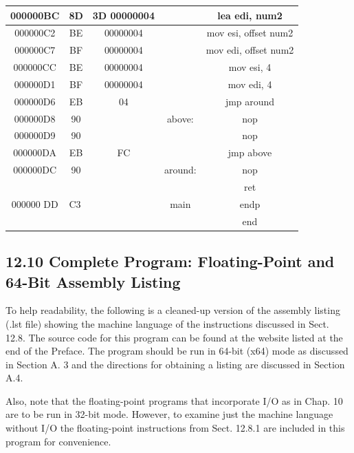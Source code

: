 \documentclass[10pt]{article}
\begin{document}
\begin{center}
\begin{tabular}{|c|c|c|c|c|}
\hline
000000BC & 8D & 3D 00000004 &  & lea edi, num2 \\
\hline
000000C2 & BE & 00000004 &  & mov esi, offset num2 \\
\hline
000000C7 & BF & 00000004 &  & mov edi, offset num2 \\
\hline
000000CC & BE & 00000004 &  & mov esi, 4 \\
\hline
000000D1 & BF & 00000004 &  & mov edi, 4 \\
\hline
000000D6 & EB & 04 &  & jmp around \\
\hline
000000D8 & 90 &  & above: & nop \\
\hline
000000D9 & 90 &  &  & nop \\
\hline
000000DA & EB & FC &  & jmp above \\
\hline
000000DC & 90 &  & around: & nop \\
\hline
\multirow[t]{3}{*}{000000 DD} & \multicolumn{2}{|l|}{\multirow[t]{3}{*}{C3}} &  & ret \\
\hline
 &  &  & main & endp \\
\hline
 &  &  &  & end \\
\hline
\end{tabular}
\end{center}

\subsection*{12.10 Complete Program: Floating-Point and 64-Bit Assembly Listing}
To help readability, the following is a cleaned-up version of the assembly listing (.lst file) showing the machine language of the instructions discussed in Sect. 12.8. The source code for this program can be found at the website listed at the end of the Preface. The program should be run in 64-bit (x64) mode as discussed in Section A. 3 and the directions for obtaining a listing are discussed in Section A.4.

Also, note that the floating-point programs that incorporate I/O as in Chap. 10 are to be run in 32-bit mode. However, to examine just the machine language without I/O the floating-point instructions from Sect. 12.8.1 are included in this program for convenience.
\end{document}
